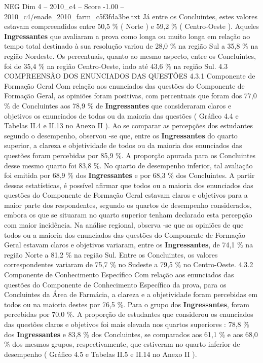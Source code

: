\begin{textsample}{NEG Dim 4 – 2010\_c4 – Score -1.00 – 2010\_c4/enade\_2010\_farm\_c5f3fda3be.txt}
Já entre os Concluintes, estes valores estavam compreendidos entre 50,5 \% ( Norte ) e 59,2 \% ( Centro-Oeste ).
Aqueles \textbf{Ingressantes} que avaliaram a prova como longa ou muito longa em relação ao tempo total destinado à sua resolução variou de 28,0 \% na região Sul a 35,8 \% na região Nordeste.
Os percentuais, quanto ao mesmo aspecto, entre os Concluintes, foi de 35,4 \% na região Centro-Oeste, indo até 43,6 \% na região Sul. 4.3 COMPREENSÃO DOS ENUNCIADOS DAS QUESTÕES 4.3.1 Componente de Formação Geral Com relação aos enunciados das questões do Componente de Formação Geral, as opiniões foram positivas, com percentuais que foram dos 77,0 \% de Concluintes aos 78,9 \% de \textbf{Ingressantes} que consideraram claros e objetivos os enunciados de todas ou da maioria das questões ( Gráfico 4.4 e Tabelas II.4 e II.13 no Anexo II ).
Ao se comparar as percepções dos estudantes segundo o desempenho, observou -se que, entre os \textbf{Ingressantes} do quarto superior, a clareza e objetividade de todos ou da maioria dos enunciados das questões foram percebidas por 85,9 \%.
A proporção apurada para os Concluintes desse mesmo quarto foi 83,8 \%.
No quarto de desempenho inferior, tal avaliação foi emitida por 68,9 \% dos \textbf{Ingressantes} e por 68,3 \% dos Concluintes.
A partir dessas estatísticas, é possível afirmar que todos ou a maioria dos enunciados das questões do Componente de Formação Geral estavam claros e objetivos para a maior parte dos respondentes, segundo os quartos de desempenho considerados, embora os que se situaram no quarto superior tenham declarado esta percepção com maior incidência.
Na análise regional, observa -se que as opiniões de que todos ou a maioria dos enunciados das questões do Componente de Formação Geral estavam claros e objetivos variaram, entre os \textbf{Ingressantes}, de 74,1 \% na região Norte a 81,2 \% na região Sul.
Entre os Concluintes, os valores correspondentes variaram de 75,7 \% no Sudeste a 79,5 \% no Centro-Oeste. 4.3.2 Componente de Conhecimento Específico Com relação aos enunciados das questões do Componente de Conhecimento Específico da prova, para os Concluintes da Área de Farmácia, a clareza e a objetividade foram percebidas em todos ou na maioria destes por 76,5 \%.
Para o grupo dos \textbf{Ingressantes}, foram percebidas por 70,0 \%.
A proporção de estudantes que considerou os enunciados das questões claros e objetivos foi mais elevada nos quartos superiores : 78,8 \% dos \textbf{Ingressantes} e 83,8 \% dos Concluintes, se comparados aos 61,1 \% e aos 68,0 \% dos mesmos grupos, respectivamente, que estiveram no quarto inferior de desempenho ( Gráfico 4.5 e Tabelas II.5 e II.14 no Anexo II ).

\end{textsample}

